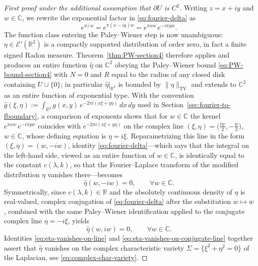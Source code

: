 \documentclass[a4paper,11pt,reqno]{amsart}
\numberwithin{equation}{section}
\theoremstyle{plain} %
\theoremstyle{definition} %
\theoremstyle{remark}
\newcommand{\R}{\mathbb{R}}
\newcommand{\C}{\mathbb{C}}
\begin{document}
\begin{proof}[First proof under the additional assumption that $\partial U$ is $C^2$]
Writing $z=x+iy$ and $w\in\C$, we rewrite the exponential factor in
\eqref{eq:fourier-delta} as
\[
e^{\pi \overline{z}\, w}=e^{\pi(x-iy)w}=e^{\pi xw}\, e^{-i\pi yw}.
\]
The function class entering the Paley--Wiener step is now unambiguous:
$\eta\in\mathcal E'(\R^2)$ is a compactly supported distribution of order
zero, in fact a finite signed Radon measure. Theorem~\ref{thm:PW-section4}
therefore applies and produces an entire function $\widehat\eta$ on
$\C^2$ obeying the Paley--Wiener bound \eqref{eq:PW-bound-section4} with
$N=0$ and $R$ equal to the radius of any closed disk containing
$U\cup\{0\}$; in particular $\widehat\eta|_{\R^2}$ is bounded by
$\|\eta\|_{\mathrm{TV}}$ and extends to $\C^2$ as an entire function of
exponential type. With the convention
$\widehat g(\xi,\eta):=\int_{\R^2}g(x,y)\,e^{-2\pi i(x\xi+y\eta)}\,dx\,dy$
used in Section~\ref{sec:fourier-to-fboundary}, a comparison of exponents
shows that for $w\in\C$ the kernel $e^{\pi xw}\,e^{-i\pi yw}$ coincides
with $e^{-2\pi i(x\xi+y\eta)}$ on the complex line
$(\xi,\eta)=\bigl(\tfrac{iw}{2},-\tfrac{w}{2}\bigr)$, $w\in\C$, whose
defining equation is $\eta=i\xi$. Reparametrizing this line in the form
$(\xi,\eta)=(w,-iw)$, identity \eqref{eq:fourier-delta}---which says that
the integral on the left-hand side, viewed as an entire function of
$w\in\C$, is identically equal to the constant $c(\lambda,k)$, so that
the Fourier--Laplace transform of the modified distribution $\eta$
vanishes there---becomes
\begin{equation}\label{eq:eta-vanishes-on-line}
\widehat{\eta}(w,-iw)=0,\qquad \forall w\in\C.
\end{equation}
Symmetrically, since $c(\lambda,k)\in\R$ and the absolutely continuous
density of $\eta$ is real-valued, complex conjugation of
\eqref{eq:fourier-delta} after the substitution $w\mapsto\overline w$,
combined with the same Paley--Wiener identification applied to the
conjugate complex line $\eta=-i\xi$, yields
\begin{equation}\label{eq:eta-vanishes-on-conjugate-line}
\widehat{\eta}(w,iw)=0,\qquad \forall w\in\C.
\end{equation}
Identities \eqref{eq:eta-vanishes-on-line} and
\eqref{eq:eta-vanishes-on-conjugate-line} together assert that
$\widehat\eta$ vanishes on the complex characteristic variety
$\Sigma=\{\xi^2+\eta^2=0\}$ of the Laplacian, see
\eqref{eq:complex-char-variety}.


\end{proof}
\end{document}
